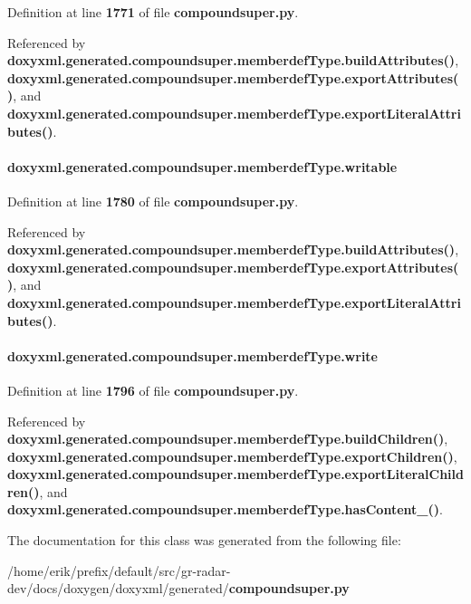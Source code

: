 Definition at line {\bf 1771} of file {\bf compoundsuper.\+py}.



Referenced by {\bf doxyxml.\+generated.\+compoundsuper.\+memberdef\+Type.\+build\+Attributes()}, {\bf doxyxml.\+generated.\+compoundsuper.\+memberdef\+Type.\+export\+Attributes()}, and {\bf doxyxml.\+generated.\+compoundsuper.\+memberdef\+Type.\+export\+Literal\+Attributes()}.

\paragraph[{writable}]{\setlength{\rightskip}{0pt plus 5cm}doxyxml.\+generated.\+compoundsuper.\+memberdef\+Type.\+writable}\label{classdoxyxml_1_1generated_1_1compoundsuper_1_1memberdefType_a03741350d2cb98d03f47a2eedb00945c}


Definition at line {\bf 1780} of file {\bf compoundsuper.\+py}.



Referenced by {\bf doxyxml.\+generated.\+compoundsuper.\+memberdef\+Type.\+build\+Attributes()}, {\bf doxyxml.\+generated.\+compoundsuper.\+memberdef\+Type.\+export\+Attributes()}, and {\bf doxyxml.\+generated.\+compoundsuper.\+memberdef\+Type.\+export\+Literal\+Attributes()}.

\paragraph[{write}]{\setlength{\rightskip}{0pt plus 5cm}doxyxml.\+generated.\+compoundsuper.\+memberdef\+Type.\+write}\label{classdoxyxml_1_1generated_1_1compoundsuper_1_1memberdefType_a7d0b997ce789657f4f1d0805f8065784}


Definition at line {\bf 1796} of file {\bf compoundsuper.\+py}.



Referenced by {\bf doxyxml.\+generated.\+compoundsuper.\+memberdef\+Type.\+build\+Children()}, {\bf doxyxml.\+generated.\+compoundsuper.\+memberdef\+Type.\+export\+Children()}, {\bf doxyxml.\+generated.\+compoundsuper.\+memberdef\+Type.\+export\+Literal\+Children()}, and {\bf doxyxml.\+generated.\+compoundsuper.\+memberdef\+Type.\+has\+Content\+\_\+()}.



The documentation for this class was generated from the following file\+:\begin{DoxyCompactItemize}
\item 
/home/erik/prefix/default/src/gr-\/radar-\/dev/docs/doxygen/doxyxml/generated/{\bf compoundsuper.\+py}\end{DoxyCompactItemize}

